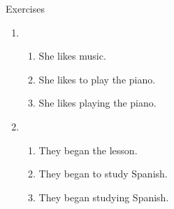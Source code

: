 \documentclass[aspectratio=169,xcolor={dvipsnames,table}]{beamer}
\begin{document}
\begin{frame}[plain]{Exercises}
 \begin{enumerate}
  \item \begin{enumerate}
	 \item She likes music.
	 \item She likes to play the piano.
	 \item She likes playing the piano.      
	\end{enumerate}
  \item \begin{enumerate}
	 \item They began the lesson.
	 \item They began to study Spanish.
	 \item They began studying Spanish.
	\end{enumerate}
 \end{enumerate}
\end{frame}
\end{document}
